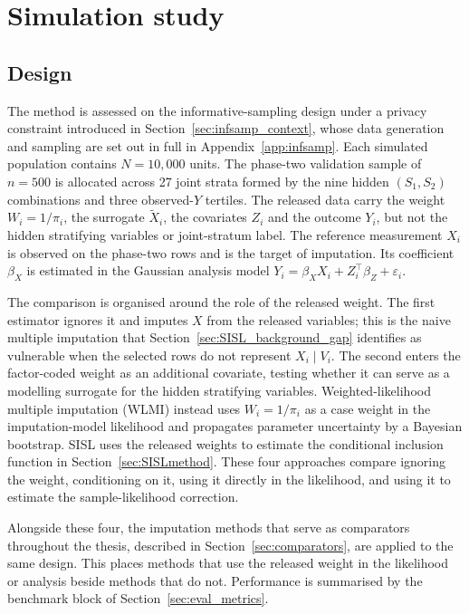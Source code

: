  
\section{Simulation study}
\label{sec:SISL_sim}

\subsection{Design}
\label{sec:SISL_sim_setup}

The method is assessed on the informative-sampling design under a privacy constraint introduced in Section~\ref{sec:infsamp_context}, whose data generation and sampling are set out in full in Appendix~\ref{app:infsamp}. Each simulated population contains $N = 10{,}000$ units. The phase-two validation sample of $n = 500$ is allocated across 27 joint strata formed by the nine hidden $(S_1,S_2)$ combinations and three observed-$Y$ tertiles. The released data carry the weight $W_i = 1/\pi_i$, the surrogate $\tilde{X}_i$, the covariates $Z_i$ and the outcome $Y_i$, but not the hidden stratifying variables or joint-stratum label. The reference measurement $X_i$ is observed on the phase-two rows and is the target of imputation. Its coefficient $\beta_X$ is estimated in the Gaussian analysis model $Y_i = \beta_X X_i + Z_i^{\top}\beta_Z + \varepsilon_i$.

The comparison is organised around the role of the released weight. The first estimator ignores it and imputes $X$ from the released variables; this is the naive multiple imputation that Section~\ref{sec:SISL_background_gap} identifies as vulnerable when the selected rows do not represent $X_i\mid V_i$. The second enters the factor-coded weight as an additional covariate, testing whether it can serve as a modelling surrogate for the hidden stratifying variables. Weighted-likelihood multiple imputation (WLMI) instead uses $W_i=1/\pi_i$ as a case weight in the imputation-model likelihood and propagates parameter uncertainty by a Bayesian bootstrap. SISL uses the released weights to estimate the conditional inclusion function in Section~\ref{sec:SISLmethod}. These four approaches compare ignoring the weight, conditioning on it, using it directly in the likelihood, and using it to estimate the sample-likelihood correction.

Alongside these four, the imputation methods that serve as comparators throughout the thesis, described in Section~\ref{sec:comparators}, are applied to the same design. This places methods that use the released weight in the likelihood or analysis beside methods that do not. Performance is summarised by the benchmark block of Section~\ref{sec:eval_metrics}.







